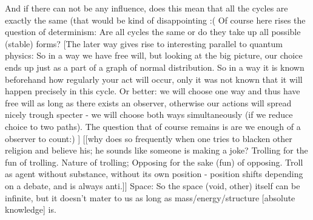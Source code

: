 \documentclass{book}
\begin{document}
And if there can not be any influence, does this mean that all the cycles are exactly the same (that would be kind of disappointing :( Of course here rises the question of determinism: Are all cycles the same or do they take up all possible (stable) forms? [The later way gives rise to interesting parallel to quantum physics: So in a way we have free will, but looking at the big picture, our choice ends up just as a part of a graph of normal distribution. So in a way it is known beforehand how regularly your act will occur, only it was not known that it will happen precisely in this cycle. Or better: we will choose one way and thus have free will as long as there exists an observer, otherwise our actions will spread nicely trough specter - we will choose both ways simultaneously (if we reduce choice to two paths). The question that of course remains is are we enough of a observer to count:) ]
[[why does so frequently when one tries to blacken other religion and believe his; he sounds like someone is making a joke? Trolling for the fun of trolling. Nature of trolling; Opposing for the sake (fun) of opposing. Troll as agent without substance, without its own position - position shifts depending on a debate, and is always anti.]]
Space:
So the space (void, other) itself can be infinite, but it doesn't mater to us as long as mass/energy/structure [absolute knowledge] is. 
\end{document}
